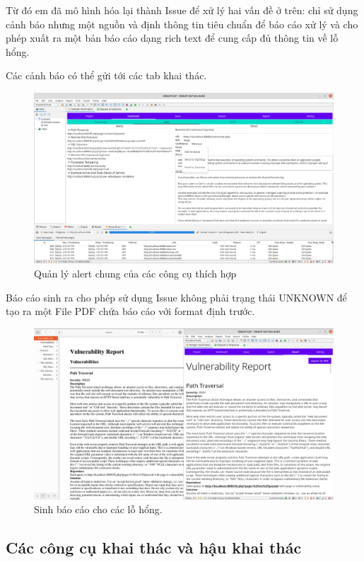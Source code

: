 \documentclass[./../main.tex]{subfiles}
\begin{document}
Từ đó em đã mô hình hóa lại thành Issue để xử lý hai vấn đề ở trên: chỉ sử dụng cảnh báo nhưng một nguồn và định thông tin tiêu chuẩn để báo cáo xử lý và cho phép xuất ra một bản báo cáo dạng rich text để cung cấp đủ thông tin về lỗ hổng.

Các cảnh báo có thể gửi tới các tab khai thác.

\begin{figure}[H]
	\includegraphics[width=\linewidth]{./images/alert.png}
	\caption{Quản lý alert chung của các công cụ thích hợp}
	\label{fig:alert}
\end{figure}

Báo cáo sinh ra cho phép sử dụng Issue không phải trạng thái UNKNOWN để tạo ra một File PDF chứa báo cáo với format định trước.

\begin{figure}[H]
	\includegraphics[width=\linewidth]{./images/report.png}
	\caption{Sinh báo cáo cho các lỗ hổng.}
	\label{fig:report}
\end{figure}

\subsection{Các công cụ khai thác và hậu khai thác}
\end{document}
